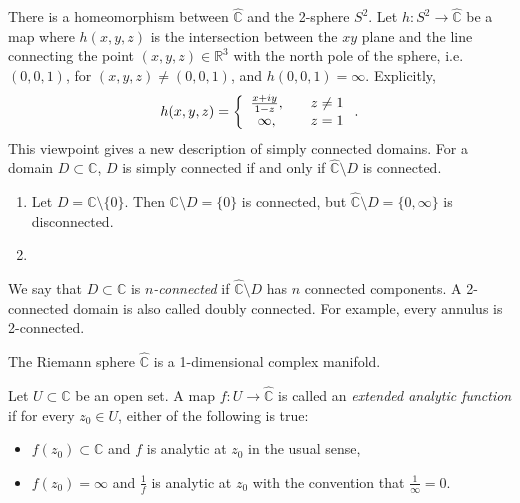 There is a homeomorphism between $\hat{\mathbb{C}}$ and the 2-sphere
$S^2$. Let $h : S^2 \to \hat{\mathbb{C}}$ be a map where
$h(x, y, z)$ is the intersection between the $xy$ plane and
the line connecting the point $(x, y, z) \in \mathbb{R}^3$ with
the north pole of the sphere, i.e. $(0, 0, 1)$, for $(x, y, z) \neq
(0, 0, 1)$, and $h(0, 0, 1) = \infty$. Explicitly,
$$
  h(x, y, z)
= \left\{
    \begin{array}{c c}
      \frac{x + i y}{1 - z}, & \quad z \neq 1 \\
      \infty,                & \quad z = 1
    \end{array}
  \right..
$$
This viewpoint gives a new description of simply connected domains.
For a domain $D \subset \mathbb{C}$, $D$ is simply connected if and
only if $\hat{\mathbb{C}} \setminus D$ is connected.

\begin{xmpl}
  \begin{enumerate}
    \item{
      Let $D = \mathbb{C} \setminus \{ 0 \}$. Then
      $\mathbb{C} \setminus D = \{ 0 \}$ is connected, but
      $\hat{\mathbb{C}} \setminus D = \{ 0, \infty \}$ is disconnected.
    }
    \item{
    }
  \end{enumerate}
\end{xmpl}

\begin{defn}[$n$-connectedness]
  We say that $D \subset \mathbb{C}$ is \emph{$n$-connected} if
  $\hat{\mathbb{C}} \setminus D$ has $n$ connected components.
  A 2-connected domain is also called doubly connected. For
  example, every annulus is 2-connected.
\end{defn}

The Riemann sphere $\hat{\mathbb{C}}$ is a 1-dimensional complex
manifold.

\begin{defn}
Let $U \subset \mathbb{C}$ be an open set.
A map
$f : U \to \hat{\mathbb{C}}$ is called an
\emph{extended analytic function} if for every $z_0 \in U$,
either of the following is true:
\begin{itemize}
  \item{
    $f(z_0) \subset \mathbb{C}$ and $f$ is analytic at $z_0$ in the
    usual sense,
  }
  \item{
    $f(z_0) = \infty$ and $\frac{1}{f}$ is analytic at $z_0$ with the
    convention that $\frac{1}{\infty} = 0$.
  }
\end{itemize}
\end{defn}

